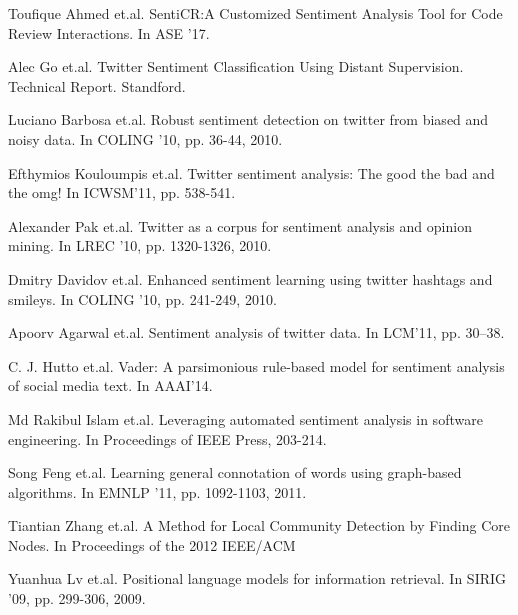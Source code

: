 \documentclass[runningheads]{llncs}
\begin{document}
\begin{thebibliography}{8}
Toufique Ahmed et.al.
\newblock SentiCR:A Customized Sentiment Analysis Tool for Code Review Interactions.
\newblock In ASE ’17.

Alec Go et.al.
\newblock Twitter Sentiment Classification Using Distant Supervision.
\newblock Technical Report. Standford.

Luciano Barbosa et.al.
\newblock Robust sentiment detection on twitter from biased and noisy data.
\newblock In COLING ’10, pp. 36-44, 2010.

Efthymios Kouloumpis et.al.
\newblock Twitter sentiment analysis: The good the bad and the omg!
\newblock In ICWSM’11, pp. 538-541.

Alexander Pak et.al.
\newblock Twitter as a corpus for sentiment analysis and opinion mining.
\newblock In LREC ’10, pp. 1320-1326, 2010.

Dmitry Davidov et.al.
\newblock Enhanced sentiment learning using twitter hashtags and smileys.
\newblock In COLING ’10, pp. 241-249, 2010.

Apoorv Agarwal et.al.
\newblock Sentiment analysis of twitter data.
\newblock In LCM’11, pp. 30–38.

C. J. Hutto et.al.
\newblock Vader: A parsimonious rule-based model for sentiment analysis of social media text.
\newblock In AAAI’14.

Md Rakibul Islam et.al.
\newblock Leveraging automated sentiment analysis in software engineering. 
\newblock In Proceedings of IEEE Press, 203-214.

Song Feng et.al.
\newblock Learning general connotation of words using graph-based algorithms.
\newblock In EMNLP ’11, pp. 1092-1103, 2011.

Tiantian Zhang et.al.
\newblock A Method for Local Community Detection by Finding Core Nodes. 
\newblock In Proceedings of the 2012 IEEE/ACM 

Yuanhua Lv et.al.
\newblock Positional language models for information retrieval.
\newblock In SIRIG ’09, pp. 299-306, 2009.


\end{thebibliography}
\end{document}
